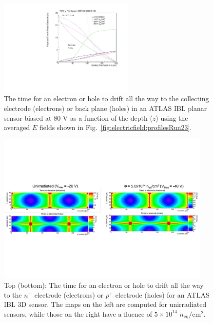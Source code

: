 \begin{figure}[!htpb]
\centering
\includegraphics[width=0.6\textwidth]{tz_0fluence80V.pdf}
\caption{The time for an electron or hole to drift all the way to the collecting electrode (electrons) or back plane (holes) in an ATLAS IBL planar sensor biased at 80 V as a function of the depth ($z$) using the averaged $E$ fields shown in Fig.~\ref{fig:electricfield:profilesRun23}.  }
\label{fig:timetoelectrode}
\end{figure}

\begin{figure}[!htpb]
\centering
\includegraphics[width=0.95\textwidth]{Figure10.pdf}
\caption{Top (bottom): The time for an electron or hole to drift all the way to the $n^+$ electrode (electrons) or $p^+$ electrode (holes) for an ATLAS IBL 3D sensor.  The maps on the left are computed for unirradiated sensors, while those on the right have a fluence of $5\times 10^{14}$ $n_\text{eq}/\text{cm}^2$.  }
\label{fig:timetoelectrode3D}
\end{figure}

